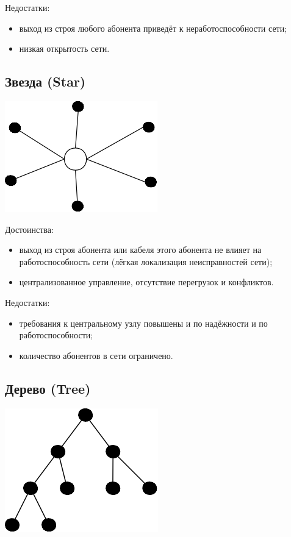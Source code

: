 \documentclass[12pt, russian, oneside, article]{ncc}
\begin{document}
Недостатки:
\begin{itemize}
\item выход из строя любого абонента приведёт к неработоспособности сети;
\item низкая открытость сети.
\end{itemize}
\subsection{Звезда (Star)}
\label{sec-2_3}


\includegraphics[]{images/SiSPI/star.png}

Достоинства:
\begin{itemize}
\item выход из строя абонента или кабеля этого абонента не влияет на работоспособность сети (лёгкая локализация неисправностей сети);
\item централизованное управление, отсутствие перегрузок и конфликтов.
\end{itemize}

Недостатки:
\begin{itemize}
\item требования к центральному узлу повышены и по надёжности и по работоспособности;
\item количество абонентов в сети ограничено.
\end{itemize}
\subsection{Дерево (Tree)}
\label{sec-2_4}


\includegraphics[]{images/SiSPI/tree.png}
\end{document}

